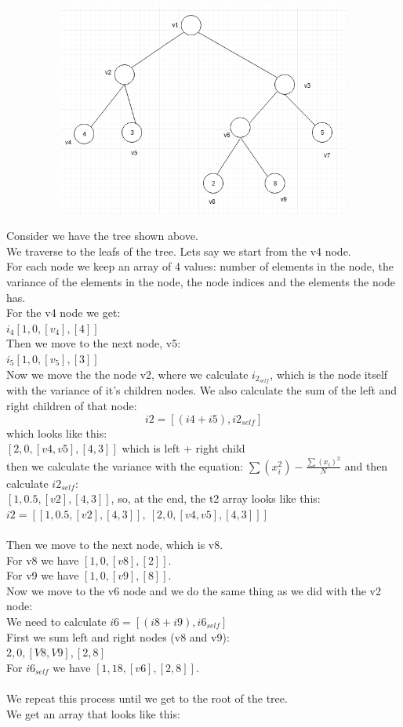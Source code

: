 \documentclass[11pt]{article}
\begin{document}
\begin{center}
\includegraphics[width=18cm, height=7cm]{tree.png}
\end{center}
Consider we have the tree shown above. \\
We traverse to the leafs of the tree. Lets say we start from the v4 node. \\
For each node we keep an array of 4 values: number of elements in the node, the variance of the elements in the node, the node indices and the elements the node has. \\
For the v4 node we get: \\
$ i_4 [ 1,0,[v_4], [4]] $ \\
Then we move to the next node, v5: \\ 
$ i_5 [1,0,[v_5], [3]] $ \\
Now we move the the node v2, where we calculate $ i_{2_{self}} $, which is the node itself with the variance of it's children nodes. We also calculate the sum of the left and right children of that node:
$$ i2 = [(i4 + i5), i2_{self}] $$
which looks like this: \\
$ [2, 0, [v4, v5], [4,3]] $ which is left + right child \\
then we calculate the variance with the equation: $ \sum(x_i^2) - \frac{\sum(x_i)^2}{N} $ and then calculate $ i2_{self} $: \\
$ [1, 0.5, [v2], [4,3]] $, so, at the end, the t2 array looks like this: \\
$ i2 = [ [1, 0.5, [v2], [4,3]], \: [2, 0, [v4, v5], [4, 3]] ] $ \\~\\
Then we move to the next node, which is v8. \\
For v8 we have $ [1, 0, [v8], [2]] $. \\
For v9 we have $ [1, 0, [v9], [8]] $. \\
Now we move to the v6 node and we do the same thing as we did with the v2 node: \\
We need to calculate $ i6 = [(i8 + i9), i6_{self}] $ \\
First we sum left and right nodes (v8 and v9): \\
$ 2, 0, [V8, V9], [2, 8] $ \\
For $ i6_{self} $ we have $ [1, 18, [v6], [2, 8]] $. \\~\\
We repeat this process until we get to the root of the tree. \\
We get an array that looks like this: \\
\end{document}
